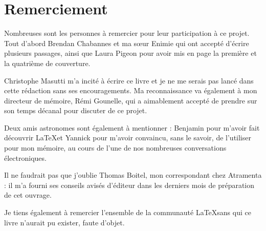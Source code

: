 \section*{Remerciement}\thispagestyle{plain}

Nombreuses sont les personnes à remercier pour leur participation à ce projet. Tout d'abord Brendan Chabannes et ma sœur Enimie qui ont accepté d'écrire plusieurs passages, ainsi que Laura Pigeon pour avoir mis en page la première et la quatrième de couverture.

Christophe Masutti m'a incité à écrire ce livre et je ne me serais pas lancé dans cette rédaction sans ses encouragements. Ma reconnaissance va également à mon directeur de mémoire, Rémi Gounelle, qui a aimablement accepté de prendre sur son temps décanal pour discuter de ce projet.

Deux amis astronomes sont également à mentionner : Benjamin pour m'avoir fait découvrir  \LaTeX et Yannick pour m'avoir convaincu, sans le savoir, de l'utiliser pour mon mémoire, au cours de l'une de nos nombreuses conversations électroniques.

Il ne faudrait pas que j'oublie Thomas Boitel, mon correspondant chez Atramenta : il m'a fourni ses conseils avisés d'éditeur dans les derniers mois de préparation de cet ouvrage.

Je tiens également à remercier l'ensemble de la communauté \LaTeX sans qui ce livre n'aurait pu exister, faute d'objet. 

